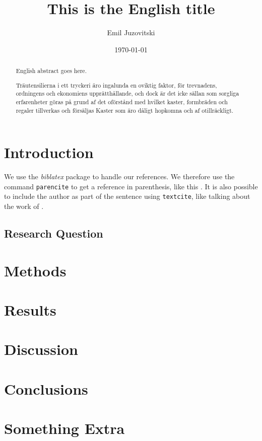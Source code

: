 \documentclass[master]{kththesis}
\title{This is the English title}
\author{Emil Juzovitski}
\date{\today}
\begin{document}
\frontmatter

\titlepage

\begin{abstract}
  English abstract goes here.

\end{abstract}


\begin{otherlanguage}{swedish}
  \begin{abstract}
    Träutensilierna i ett tryckeri äro ingalunda en oviktig faktor,
    för trevnadens, ordningens och ekonomiens upprätthållande, och
    dock är det icke sällan som sorgliga erfarenheter göras på grund
    af det oförstånd med hvilket kaster, formbräden och regaler
    tillverkas och försäljas Kaster som äro dåligt hopkomna och af
    otillräckligt.
  \end{abstract}
\end{otherlanguage}


\tableofcontents


\mainmatter


\chapter{Introduction}

We use the \emph{biblatex} package to handle our references.  We therefore use the
command \texttt{parencite} to get a reference in parenthesis, like this
\parencite{DENG201684}.  It is also possible to include the author
as part of the sentence using \texttt{textcite}, like talking about
the work of \textcite{DENG201684}.

\section{Research Question}



\chapter{Methods}

\chapter{Results}

\chapter{Discussion}

\chapter{Conclusions}

\printbibliography[heading=bibintoc]

\appendix

\chapter{Something Extra}

\tailmatter
\end{document}
